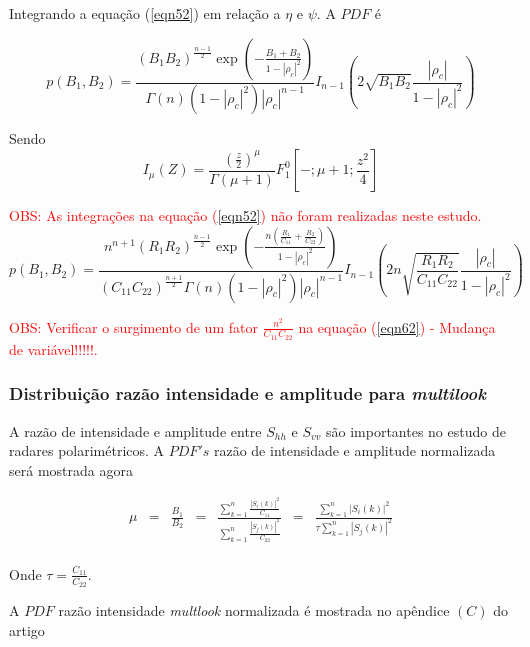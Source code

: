 Integrando a equação (\ref{eqn52}) em relação a $\eta$ e $\psi$. A $PDF$ é

\begin{equation}\label{eqn60}
	p(B_1,B_2)=\frac{\left(B_1B_2\right)^{\frac{n-1}{2}}\exp\left(-\frac{B_1+B_2}{1-|\rho_c|^2}\right)}{\Gamma(n)(1-|\rho_c|^2)|\rho_c|^{n-1}}I_{n-1}\left(2\sqrt{B_1B_2}\frac{|\rho_c|}{1-|\rho_c|^2}\right)
\end{equation}

Sendo
\begin{equation}\label{eqn61}
	I_{\mu}(Z)=\frac{(\frac{z}{2})^{\mu}}{\Gamma(\mu+1)} F_{1}^{0}[-;\mu+1;\frac{z^2}{4}]
\end{equation}

\textcolor{red}{OBS: As integrações na equação (\ref{eqn52}) não foram realizadas neste estudo.}
\begin{equation}\label{eqn62}
	p(B_1,B_2)=\frac{n^{n+1}\left(R_1R_2\right)^{\frac{n-1}{2}}\exp\left(-\frac{n(\frac{R_1}{C_{11}}+\frac{R_2}{C_{22}})}{1-|\rho_c|^2}\right)}{(C_{11}C_{22})^{\frac{n+1}{2}}\Gamma(n)(1-|\rho_c|^2)|\rho_c|^{n-1}}I_{n-1}\left(2n\sqrt{\frac{R_1R_2}{C_{11}C_{22}}}\frac{|\rho_c|}{1-|\rho_c|^2}\right)
\end{equation}

\textcolor{red}{OBS: Verificar o surgimento de um fator $\frac{n^2}{C_{11}C_{22}}$ na equação  (\ref{eqn62}) - Mudança de variável!!!!!.}

\subsubsection{Distribuição razão intensidade e amplitude para {\it multilook}}

A razão de intensidade e amplitude entre $S_{hh}$ e $S_{vv}$ são importantes no estudo de radares polarimétricos. A $PDF's$ razão de intensidade e amplitude normalizada será mostrada agora

\begin{equation}\label{eqn63}
\begin{array}{ccccccc}
	\mu&=&\frac{B_1}{B_2}&=&\frac{\sum_{k=1}^{n}\frac{|S_i(k)|^2}{C_{11}}}{\sum_{k=1}^{n}\frac{|S_j(k)|^2}{C_{22}}}&=&\frac{\sum_{k=1}^{n}|S_i(k)|^2}{\tau\sum_{k=1}^{n}|S_j(k)|^2}\\
\end{array}
\end{equation}

Onde $\tau=\frac{C_{11}}{C_{22}}$.

A $PDF$ razão intensidade {\it multlook} normalizada é mostrada no apêndice $(C)$ do artigo \cite{lee}  


